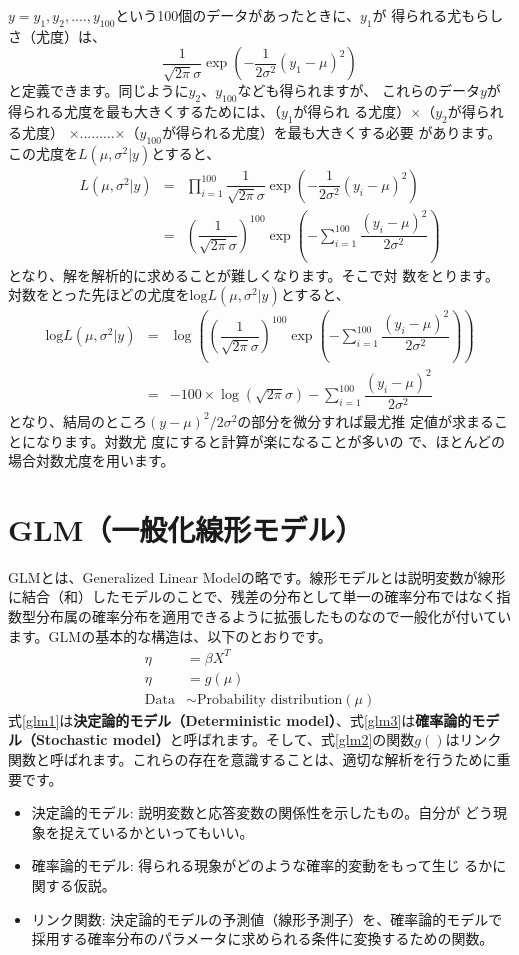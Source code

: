 $y = y_1, y_2, ...., y_{100}$という100個のデータがあったときに、$y_1$が
得られる尤もらしさ（尤度）は、
\[
 \dfrac{1}{\sqrt{2\pi}\sigma}\exp(-\dfrac{1}{2\sigma^{2}}(y_1 -
\mu)^{2})
\]
と定義できます。同じように$y_2$、$y_{100}$なども得られますが、
これらのデータ$y$が得られる尤度を最も大きくするためには、（$y_1$が得られ
る尤度）$\times$（$y_2$が得られる尤度）
$\times$.........$\times$（$y_{100}$が得られる尤度）を最も大きくする必要
があります。この尤度を$L(\mu, \sigma^{2} | y)$とすると、
\begin{eqnarray*}
 L(\mu, \sigma^{2} | y) &=& \prod^{100}_{i = 1}
 \dfrac{1}{\sqrt{2\pi}\sigma}\exp(-\dfrac{1}{2\sigma^{2}}(y_i -
 \mu)^{2}) \\
 &=& (\dfrac{1}{\sqrt{2\pi}\sigma})^{100}\exp(-\sum^{100}_{i =
 1}\dfrac{(y_{i} - \mu)^{2}}{2\sigma^{2}})
\end{eqnarray*}
となり、解を解析的に求めることが難しくなります。そこで対
数をとります。対数をとった先ほどの尤度を$\text{log}L(\mu, \sigma^{2} | y)$とすると、
\begin{eqnarray*}
  \text{log}L(\mu, \sigma^{2} | y) &=&
  \log ((\dfrac{1}{\sqrt{2\pi}\sigma})^{100}\exp(-\sum^{100}_{i =
 1}\dfrac{(y_{i} - \mu)^{2}}{2\sigma^{2}})) \\
 &=& -100 \times \log (\sqrt{2\pi}\sigma) - \sum^{100}_{i =
  1}\dfrac{(y_{i} - \mu)^{2}}{2\sigma^{2}} 
\end{eqnarray*}
となり、結局のところ$(y - \mu)^{2}/2\sigma^{2}$の部分を微分すれば最尤推
定値が求まることになります。対数尤
度にすると計算が楽になることが多いの
で、ほとんどの場合対数尤度を用います。

\clearpage
\section{GLM（一般化線形モデル）}
GLMとは、Generalized Linear Modelの略です。線形モデルとは説明変数が線形に結合（和）したモデルのことで、残差の分布として単一の確率分布ではなく指数型分布属の確率分布を適用できるように拡張したものなので一般化が付いています。GLMの基本的な構造は、以下のとおりです。
\begin{align}
\eta &= \beta X^{T} \label{glm1}\\
\eta &= g(\mu) \label{glm2} \\
\mathrm{Data} &\sim \text{Probability distribution}(\mu)\label{glm3}
\end{align}
式\ref{glm1}は\textbf{決定論的モデル（Deterministic model）}、式\ref{glm3}は\textbf{確率論的モデル（Stochastic model）}と呼ばれます。そして、式\ref{glm2}の関数$g()$はリンク関数と呼ばれます。これらの存在を意識することは、適切な解析を行うために重要です。
\begin{itemize}
 \item {}決定論的モデル: 説明変数と応答変数の関係性を示したもの。自分が
       どう現象を捉えているかといってもいい。
 \item 確率論的モデル: 得られる現象がどのような確率的変動をもって生じ
       るかに関する仮説。
  \item リンク関数: 決定論的モデルの予測値（線形予測子）を、確率論的モデルで採用する確率分布のパラメータに求められる条件に変換するための関数。
\end{itemize}
